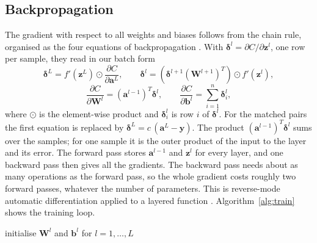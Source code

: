 \subsection*{Backpropagation}

The gradient with respect to all weights and biases follows from the chain rule, organised as the four equations of backpropagation \cite[Sec.~8.8.4]{HjorthJensen2026}. With $\boldsymbol{\delta}^l = \partial C / \partial \mathbf{z}^l$, one row per sample, they read in our batch form
$$
\boldsymbol{\delta}^L = f'(\mathbf{z}^L)\odot\frac{\partial C}{\partial \mathbf{a}^L}, \qquad
\boldsymbol{\delta}^l = \left(\boldsymbol{\delta}^{l+1}\left(\mathbf{W}^{l+1}\right)^T\right)\odot f'(\mathbf{z}^l),
$$
$$
\frac{\partial C}{\partial \mathbf{W}^l} = \left(\mathbf{a}^{l-1}\right)^T\boldsymbol{\delta}^l, \qquad
\frac{\partial C}{\partial \mathbf{b}^l} = \sum_{i=1}^{n}\boldsymbol{\delta}^l_{i},
$$
where $\odot$ is the element-wise product and $\boldsymbol{\delta}^l_i$ is row $i$ of $\boldsymbol{\delta}^l$. For the matched pairs the first equation is replaced by $\boldsymbol{\delta}^L = c\,(\mathbf{a}^L - \mathbf{y})$. The product $(\mathbf{a}^{l-1})^T\boldsymbol{\delta}^l$ sums over the samples; for one sample it is the outer product of the input to the layer and its error. The forward pass stores $\mathbf{a}^{l-1}$ and $\mathbf{z}^l$ for every layer, and one backward pass then gives all the gradients. The backward pass needs about as many operations as the forward pass, so the whole gradient costs roughly two forward passes, whatever the number of parameters. This is reverse-mode automatic differentiation applied to a layered function \cite[Secs.~4.14, 8.8]{HjorthJensen2026}. Algorithm~\ref{alg:train} shows the training loop.

\begin{algorithm}
\caption{Training with minibatches}\label{alg:train}
initialise $\mathbf{W}^l$ and $\mathbf{b}^l$ for $l = 1, \dots, L$\;
\end{algorithm}

